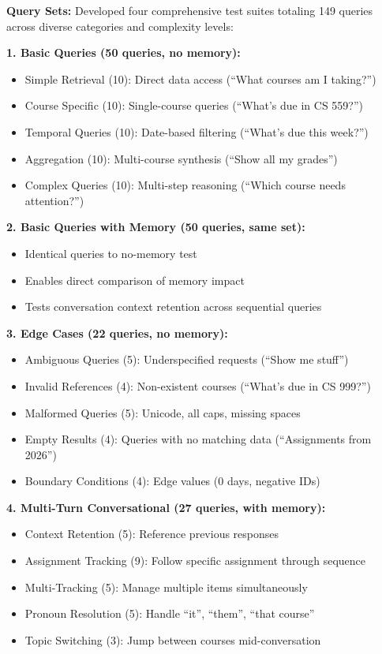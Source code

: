 \documentclass{article}
\begin{document}
\textbf{Query Sets:} Developed four comprehensive test suites totaling 149 queries across diverse categories and complexity levels:

\textbf{1. Basic Queries (50 queries, no memory):}
\begin{itemize}
    \item Simple Retrieval (10): Direct data access (``What courses am I taking?'')
    \item Course Specific (10): Single-course queries (``What's due in CS 559?'')
    \item Temporal Queries (10): Date-based filtering (``What's due this week?'')
    \item Aggregation (10): Multi-course synthesis (``Show all my grades'')
    \item Complex Queries (10): Multi-step reasoning (``Which course needs attention?'')
\end{itemize}

\textbf{2. Basic Queries with Memory (50 queries, same set):}
\begin{itemize}
    \item Identical queries to no-memory test
    \item Enables direct comparison of memory impact
    \item Tests conversation context retention across sequential queries
\end{itemize}

\textbf{3. Edge Cases (22 queries, no memory):}
\begin{itemize}
    \item Ambiguous Queries (5): Underspecified requests (``Show me stuff'')
    \item Invalid References (4): Non-existent courses (``What's due in CS 999?'')
    \item Malformed Queries (5): Unicode, all caps, missing spaces
    \item Empty Results (4): Queries with no matching data (``Assignments from 2026'')
    \item Boundary Conditions (4): Edge values (0 days, negative IDs)
\end{itemize}

\textbf{4. Multi-Turn Conversational (27 queries, with memory):}
\begin{itemize}
    \item Context Retention (5): Reference previous responses
    \item Assignment Tracking (9): Follow specific assignment through sequence
    \item Multi-Tracking (5): Manage multiple items simultaneously  
    \item Pronoun Resolution (5): Handle ``it'', ``them'', ``that course''
    \item Topic Switching (3): Jump between courses mid-conversation
\end{itemize}
\end{document}

